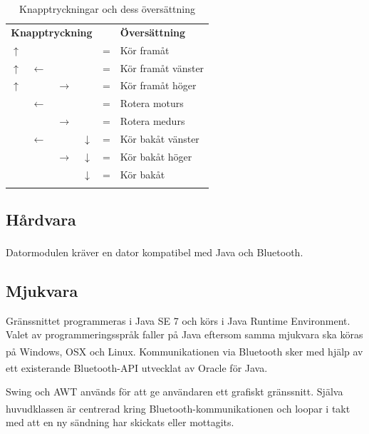 \documentclass[11pt]{article}
\begin{document}
\begin{flushleft}
\begin{longtable}{|p{.05\linewidth} p{.05\linewidth} p{.05\linewidth} p{.05\linewidth} c l|}
	\multicolumn{4}{c}{\textbf{Knapptryckning}} & & \multicolumn{1}{l}{\textbf{Översättning}} 	\\ \nobreakhline\nobreakhline 
	$\uparrow$ &  				&  				& 				& = & Kör framåt 				\\ \nobreakhline 
	$\uparrow$ & $\leftarrow$	&				&				& = & Kör framåt vänster 		\\ \nobreakhline 
	$\uparrow$ &				& $\rightarrow$	&				& = & Kör framåt höger 			\\ \nobreakhline 
			   & $\leftarrow$	&				&				& = & Rotera moturs 			\\ \nobreakhline
			   &				& $\rightarrow$	&				& = & Rotera medurs 			\\ \nobreakhline
			   & $\leftarrow$	&				& $\downarrow$	& = & Kör bakåt vänster 		\\ \nobreakhline
			   &				& $\rightarrow$ & $\downarrow$	& = & Kör bakåt höger 			\\ \nobreakhline
			   &				&				& $\downarrow$	& = & Kör bakåt 				\\ \nobreakhline
	\caption{Knapptryckningar och dess översättning} \label{datormodul:combinations}
\end{longtable}



\subsection{Hårdvara}
Datormodulen kräver en dator kompatibel med Java och Bluetooth\textsuperscript{\circledR}. 

\subsection{Mjukvara}
Gränssnittet programmeras i Java SE 7 och körs i Java Runtime Environment. Valet av programmeringsspråk faller på Java eftersom samma mjukvara ska köras på Windows, OSX och Linux. Kommunikationen via Bluetooth\textsuperscript{\circledR} sker med hjälp av ett existerande Bluetooth\textsuperscript{\circledR}-API utvecklat av Oracle för Java. 

Swing och AWT används för att ge användaren ett grafiskt gränssnitt. Själva huvudklassen är centrerad kring Bluetooth\textsuperscript{\circledR}-kommunikationen och loopar i takt med att en ny sändning har skickats eller mottagits. 


\end{flushleft}
\end{document}
